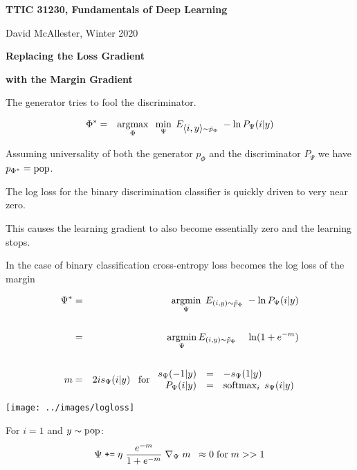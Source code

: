 





{\Huge

  \centerline{\bf TTIC 31230, Fundamentals of Deep Learning}
  \bigskip
  \centerline{David McAllester, Winter 2020}
  \vfill
  \centerline{\bf Replacing the Loss Gradient}
  \vfill
  \centerline{\bf with the Margin Gradient}
\vfill
\vfill


The generator tries to fool the discriminator.

\vfill
\begin{eqnarray*}
\Phi^* & = & \operatorname*{argmax}_\Phi\;\;\min_\Psi\;E_{{\mbox{$\langle i,y\rangle$}} \sim \tilde{p}_\Phi}\;-\ln P_\Psi(i|y)
\end{eqnarray*}

\vfill
Assuming universality of both the generator $p_\Phi$ and the discriminator $P_\Psi$ we have {\color{red} $p_{\Phi^*} = \mathrm{pop}$}.


The log loss for the binary discrimination classifier is quickly driven to very near zero.

\vfill
This causes the learning gradient to also become essentially zero and the learning stops.


In the case of binary classification cross-entropy loss becomes the log loss of the margin

\begin{eqnarray*}
\Psi^* & = & \operatorname*{argmin}_\Psi \;E_{(i,y) \sim \tilde{p}_\Phi}\;- \ln P_\Psi(i|y) \\
\\
& = & \operatorname*{argmin}_\Psi E_{(i,y) \sim \tilde{p}_\Phi}\;\;\;\;\ln(1 + e^{-m}) \\
\\
m & = & 2is_\Psi(i|y)\;\;\;\mbox{for $\begin{array}{rcl} s_\Psi(-1|y) & = & -s_\Psi(1|y) \\\;P_\Psi(i|y) & = & \operatorname*{softmax}_i\;s_\Psi(i|y) \end{array}$}
\end{eqnarray*}


\centerline{\texttt{[image: ../images/logloss]}}


For $i = 1$ and $y \sim \mathrm{pop}$:
$$\Psi \;\mbox{\tt +=} \; \eta\;\frac{e^{-m}}{1 + e^{-m}}\;\nabla_\Psi \; m \;\;\approx 0 \;\mbox{for}\;m >> 1$$

}
